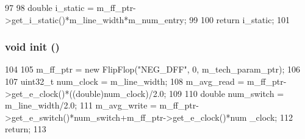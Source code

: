 \begin{DoxyCode}
97 {
98     double i_static = m_ff_ptr->get_i_static()*m_line_width*m_num_entry;
99 
100     return i_static;
101 }
\end{DoxyCode}
\hypertarget{classRegister_a02fd73d861ef2e4aabb38c0c9ff82947}{
\subsubsection[{init}]{\setlength{\rightskip}{0pt plus 5cm}void init ()}}
\label{classRegister_a02fd73d861ef2e4aabb38c0c9ff82947}



\begin{DoxyCode}
104 {
105     m_ff_ptr = new FlipFlop("NEG_DFF", 0, m_tech_param_ptr);
106 
107     uint32_t num_clock = m_line_width;
108     m_avg_read = m_ff_ptr->get_e_clock()*((double)num_clock)/2.0;
109 
110     double num_switch = m_line_width/2.0;
111     m_avg_write = m_ff_ptr->get_e_switch()*num_switch+m_ff_ptr->get_e_clock()*num
      _clock;
112     return;
113 }
\end{DoxyCode}


